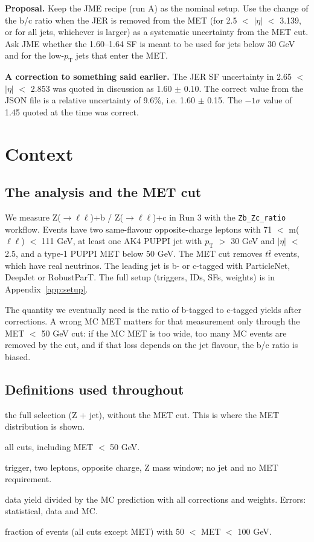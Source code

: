\documentclass[11pt,a4paper]{article}
\newcommand{\pt}{$p_\mathrm{T}$}
\newcommand{\aeta}{$|\eta|$}
\begin{document}
\textbf{Proposal.} Keep the JME recipe (run A) as the nominal setup. Use the change of the b/c ratio when the JER is
removed from the MET (for 2.5 $<$ \aeta{} $<$ 3.139, or for all jets, whichever is larger) as a systematic uncertainty
from the MET cut. Ask JME whether the 1.60--1.64 SF is meant to be used for jets below 30 GeV and for the low-\pt{}
jets that enter the MET.

\textbf{A correction to something said earlier.} The JER SF uncertainty in 2.65 $<$ \aeta{} $<$ 2.853 was quoted
in discussion as 1.60 $\pm$ 0.10. The correct value from the JSON file is a relative uncertainty of 9.6\%, i.e.
1.60 $\pm$ 0.15. The $-1\sigma$ value of 1.45 quoted at the time was correct.

\section{Context}

\subsection{The analysis and the MET cut}
We measure Z($\to\ell\ell$)+b / Z($\to\ell\ell$)+c in Run 3 with the \texttt{Zb\_Zc\_ratio} workflow.
Events have two same-flavour opposite-charge leptons with 71 $<$ m($\ell\ell$) $<$ 111 GeV, at least one AK4 PUPPI jet
with \pt{} $>$ 30 GeV and \aeta{} $<$ 2.5, and a type-1 PUPPI MET below 50 GeV. The MET cut removes $t\bar t$ events,
which have real neutrinos. The leading jet is b- or c-tagged with ParticleNet, DeepJet or RobustParT. The full setup
(triggers, IDs, SFs, weights) is in Appendix~\ref{app:setup}.

The quantity we eventually need is the ratio of b-tagged to c-tagged yields after corrections. A wrong MC MET
matters for that measurement only through the MET $<$ 50 GeV cut: if the MC MET is too wide, too many MC events are
removed by the cut, and if that loss depends on the jet flavour, the b/c ratio is biased.

\subsection{Definitions used throughout}
\begin{description}[leftmargin=2.8cm,style=nextline]
\item[All cuts except MET] the full selection (Z + jet), without the MET cut. This is where the MET distribution is shown.
\item[Full selection] all cuts, including MET $<$ 50 GeV.
\item[Z stage] trigger, two leptons, opposite charge, Z mass window; no jet and no MET requirement.
\item[data/MC] data yield divided by the MC prediction with all corrections and weights. Errors: statistical, data and MC.
\item[MET 50--100 fraction] fraction of events (all cuts except MET) with 50 $<$ MET $<$ 100 GeV.
\end{description}
\end{document}
